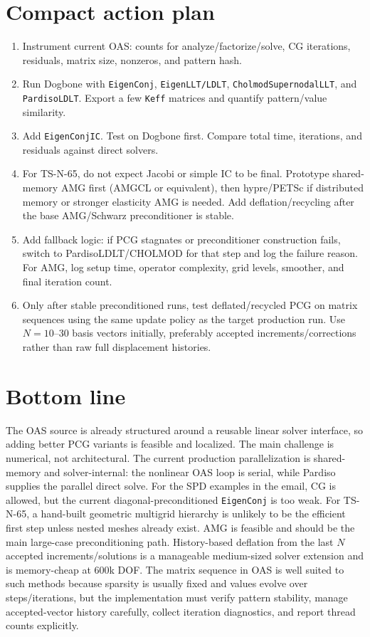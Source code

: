 \documentclass[10pt,a4paper]{article}
\newcommand{\code}[1]{\texttt{#1}}
\begin{document}
\section{Compact action plan}

\begin{enumerate}
  \item Instrument current OAS: counts for analyze/factorize/solve, CG iterations, residuals, matrix size, nonzeros, and pattern hash.
  \item Run Dogbone with \code{EigenConj}, \code{EigenLLT/LDLT}, \code{CholmodSupernodalLLT}, and \code{PardisoLDLT}. Export a few \code{Keff} matrices and quantify pattern/value similarity.
  \item Add \code{EigenConjIC}. Test on Dogbone first. Compare total time, iterations, and residuals against direct solvers.
  \item For TS-N-65, do not expect Jacobi or simple IC to be final. Prototype shared-memory AMG first (AMGCL or equivalent), then hypre/PETSc if distributed memory or stronger elasticity AMG is needed. Add deflation/recycling after the base AMG/Schwarz preconditioner is stable.
  \item Add fallback logic: if PCG stagnates or preconditioner construction fails, switch to PardisoLDLT/CHOLMOD for that step and log the failure reason. For AMG, log setup time, operator complexity, grid levels, smoother, and final iteration count.
  \item Only after stable preconditioned runs, test deflated/recycled PCG on matrix sequences using the same update policy as the target production run. Use $N=10$--$30$ basis vectors initially, preferably accepted increments/corrections rather than raw full displacement histories.
\end{enumerate}

\section*{Bottom line}

The OAS source is already structured around a reusable linear solver interface, so adding better PCG variants is feasible and localized. The main challenge is numerical, not architectural. The current production parallelization is shared-memory and solver-internal: the nonlinear OAS loop is serial, while Pardiso supplies the parallel direct solve. For the SPD examples in the email, CG is allowed, but the current diagonal-preconditioned \code{EigenConj} is too weak. For TS-N-65, a hand-built geometric multigrid hierarchy is unlikely to be the efficient first step unless nested meshes already exist. AMG is feasible and should be the main large-case preconditioning path. History-based deflation from the last $N$ accepted increments/solutions is a manageable medium-sized solver extension and is memory-cheap at 600k DOF. The matrix sequence in OAS is well suited to such methods because sparsity is usually fixed and values evolve over steps/iterations, but the implementation must verify pattern stability, manage accepted-vector history carefully, collect iteration diagnostics, and report thread counts explicitly.
\end{document}
